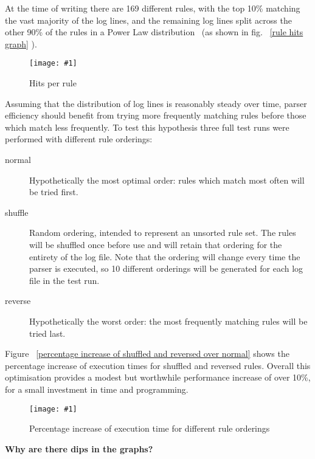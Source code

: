 \documentclass[draft]{svmult}
\newcommand{\showgraph}[3]{%
    \begin{figure}[hbt!]
        \caption{#2}\label{#3}
        \texttt{[image: \#1]}
    \end{figure}
}
\newcommand{\refwithpage}[1]{%
    \empty{}\vref{#1}%
}
\newcommand{\numberOFrules}[0]{%
    169%
}
\begin{document}
\label{Rule ordering}
\label{rule ordering for efficiency}
\label{rule efficiency}

At the time of writing there are \numberOFrules{} different rules, with the
top 10\% matching the vast majority of the log lines, and the remaining log
lines split across the other 90\% of the rules in a Power Law
distribution~\cite{powerlaw} (as shown in fig.~\refwithpage{rule hits
graph}).  \showgraph{build/plot-hits}{Hits per rule}{rule hits graph}
Assuming that the distribution of log lines is reasonably steady over time,
parser efficiency should benefit from trying more frequently matching rules
before those which match less frequently.  To test this hypothesis three
full test runs were performed with different rule orderings:

\begin{description}

    \item [normal]  Hypothetically the most optimal order: rules which
        match most often will be tried first.

    \item [shuffle] Random ordering, intended to represent an unsorted rule
        set.  The rules will be shuffled once before use and will retain
        that ordering for the entirety of the log file.  Note that the
        ordering will change every time the parser is executed, so 10
        different orderings will be generated for each log file in the test
        run.

    \item [reverse] Hypothetically the worst order: the most frequently
        matching rules will be tried last.

\end{description}

Figure~\refwithpage{percentage increase of shuffled and reversed over
normal} shows the percentage increase of execution times for shuffled and
reversed rules.  Overall this optimisation provides a modest but worthwhile
performance increase of over 10\%, for a small investment in time and
programming.
\showgraph{build/plot-normal-shuffle-reverse-factor}{Percentage increase of
execution time for different rule orderings}{percentage increase of
shuffled and reversed over normal}

\noindent\textbf{Why are there dips in the graphs?}

\label{Why are there dips in the graphs?}
\end{document}
